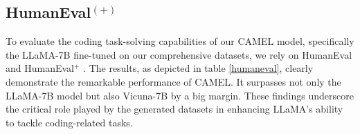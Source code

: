 \subsection{HumanEval$^{(+)}$}
\begin{table}[h]
  \centering
  \caption{\textbf{HumanEval$^{(+)}$ for Various Models.} We test our CAMEL model, which is a LLaMa-7B fine-tuned on all our datasets (AI Society, Code, Math, Science) on HumanEval and HumanEval$^{+}$ benchmarks, where we show competitive pass$@k$ scores with LLaMa-7B and Vicuna-7B.}
  \label{humaneval}
\end{table}
To evaluate the coding task-solving capabilities of our CAMEL model, specifically the LLaMA-7B fine-tuned on our comprehensive datasets, we rely on HumanEval \cite{chen2021evaluating} and HumanEval$^{+}$ \cite{evalplus}. The results, as depicted in table \ref{humaneval}, clearly demonstrate the remarkable performance of CAMEL. It surpasses not only the LLaMA-7B model but also Vicuna-7B \cite{vicuna} by a big margin. These findings underscore the critical role played by the generated datasets in enhancing LLaMA's ability to tackle coding-related tasks.


